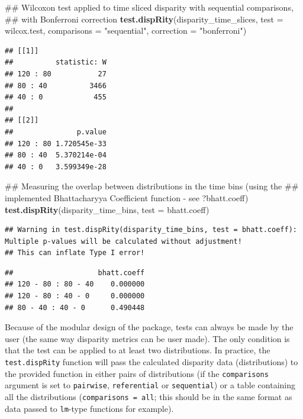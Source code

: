 \documentclass[]{book}
\newenvironment{Shaded}{\begin{snugshade}}{\end{snugshade}}
\newcommand{\KeywordTok}[1]{\textcolor[rgb]{0.13,0.29,0.53}{\textbf{#1}}}
\newcommand{\DataTypeTok}[1]{\textcolor[rgb]{0.13,0.29,0.53}{#1}}
\newcommand{\StringTok}[1]{\textcolor[rgb]{0.31,0.60,0.02}{#1}}
\newcommand{\NormalTok}[1]{#1}
\theoremstyle{definition}
\theoremstyle{definition}
\theoremstyle{definition}
\theoremstyle{remark}
\begin{document}
\begin{Shaded}
\begin{Highlighting}[]
\NormalTok{## Wilcoxon test applied to time sliced disparity with sequential comparisons,}
\NormalTok{## with Bonferroni correction}
\KeywordTok{test.dispRity}\NormalTok{(disparity_time_slices, }\DataTypeTok{test =}\NormalTok{ wilcox.test,}
              \DataTypeTok{comparisons =} \StringTok{"sequential"}\NormalTok{, }\DataTypeTok{correction =} \StringTok{"bonferroni"}\NormalTok{)}
\end{Highlighting}
\end{Shaded}

\begin{verbatim}
## [[1]]
##          statistic: W
## 120 : 80           27
## 80 : 40          3466
## 40 : 0            455
## 
## [[2]]
##               p.value
## 120 : 80 1.720545e-33
## 80 : 40  5.370214e-04
## 40 : 0   3.599349e-28
\end{verbatim}

\begin{Shaded}
\begin{Highlighting}[]
\NormalTok{## Measuring the overlap between distributions in the time bins (using the}
\NormalTok{## implemented Bhattacharyya Coefficient function - see ?bhatt.coeff)}
\KeywordTok{test.dispRity}\NormalTok{(disparity_time_bins, }\DataTypeTok{test =}\NormalTok{ bhatt.coeff)}
\end{Highlighting}
\end{Shaded}

\begin{verbatim}
## Warning in test.dispRity(disparity_time_bins, test = bhatt.coeff): Multiple p-values will be calculated without adjustment!
## This can inflate Type I error!
\end{verbatim}

\begin{verbatim}
##                    bhatt.coeff
## 120 - 80 : 80 - 40    0.000000
## 120 - 80 : 40 - 0     0.000000
## 80 - 40 : 40 - 0      0.490448
\end{verbatim}

Because of the modular design of the package, tests can always be made
by the user (the same way disparity metrics can be user made). The only
condition is that the test can be applied to at least two distributions.
In practice, the \texttt{test.dispRity} function will pass the
calculated disparity data (distributions) to the provided function in
either pairs of distributions (if the \texttt{comparisons} argument is
set to \texttt{pairwise}, \texttt{referential} or \texttt{sequential})
or a table containing all the distributions
(\texttt{comparisons\ =\ all}; this should be in the same format as data
passed to \texttt{lm}-type functions for example).
\end{document}

